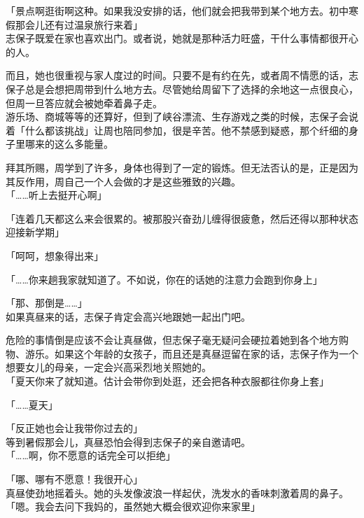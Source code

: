 「景点啊逛街啊这种。如果我没安排的话，他们就会把我带到某个地方去。初中寒假那会儿还有过温泉旅行来着」\\

志保子既爱在家也喜欢出门。或者说，她就是那种活力旺盛，干什么事情都很开心的人。

而且，她也很重视与家人度过的时间。只要不是有约在先，或者周不情愿的话，志保子总是会想把周带到什么地方去。尽管她给周留下了选择的余地这一点很良心，但周一旦答应就会被她牵着鼻子走。\\

游乐场、商城等等的还算好，但到了峡谷漂流、生存游戏之类的时候，志保子会说着「什么都该挑战」让周也陪同参加，很是辛苦。他不禁感到疑惑，那个纤细的身子里哪来的这么多能量。

拜其所赐，周学到了许多，身体也得到了一定的锻炼。但无法否认的是，正是因为其反作用，周自己一个人会做的才是这些雅致的兴趣。\\

「……听上去挺开心啊」

「连着几天都这么来会很累的。被那股兴奋劲儿缠得很疲惫，然后还得以那种状态迎接新学期」

「呵呵，想象得出来」

「……你来趟我家就知道了。不如说，你在的话她的注意力会跑到你身上」

「那、那倒是……」\\

如果真昼来的话，志保子肯定会高兴地跟她一起出门吧。

危险的事情倒是应该不会让真昼做，但志保子毫无疑问会硬拉着她到各个地方购物、游乐。如果这个年龄的女孩子，而且还是真昼逗留在家的话，志保子作为一个想要女儿的母亲，一定会兴高采烈地关照她的。\\

「夏天你来了就知道。估计会带你到处逛，还会把各种衣服都往你身上套」

「……夏天」

「反正她也会让我带你过去的」\\

等到暑假那会儿，真昼恐怕会得到志保子的亲自邀请吧。\\

「……啊，你不愿意的话完全可以拒绝」

「哪、哪有不愿意！我很开心」\\

真昼使劲地摇着头。她的头发像波浪一样起伏，洗发水的香味刺激着周的鼻子。\\

「嗯。我会去问下我妈的，虽然她大概会很欢迎你来家里」

